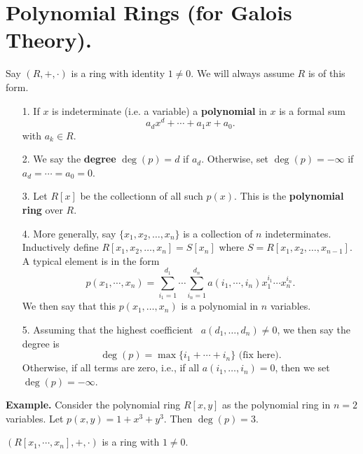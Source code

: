\documentclass[12pt,letterpaper]{algebra_book}
\theoremstyle{definition}
\begin{document}
\section{Polynomial Rings (for Galois Theory).}

\begin{definition}
    Say $(R, +, \cdot)$ is a ring with identity $1 \ne 0$. We will
    always assume $R$ is of this form. 
    \begin{itemize}
        \item[1.] If $x$  is indeterminate (i.e. a variable) a
        \textbf{polynomial} in $x$ is a formal sum 
        \[
            a_dx^d + \cdots + a_1x + a_0.
        \]
        with $a_k \in R$.
        \item[2.] We say the \textbf{degree} $\deg(p) = d$ if $a_d$.
        Otherwise, set  $\deg(p) = -\infty$ if $a_d = \cdots = a_0
        = 0$.
        \item[3.] Let $R[x]$ be the collectionn of all such
        $p(x)$. This is the \textbf{polynomial ring} over $R$.
        \item[4.] More generally, say $\{x_1, x_2, \dots, x_n\}$
        is a collection of $n$ indeterminates. Inductively define
        $R[x_1, x_2, \dots, x_n] = S[x_n]$ where $S = R[x_1, x_2,
        \dots, x_{n-1}]$. A typical element is in the form 
        \[
            p(x_1, \cdots, x_n) = \sum_{i_1 =  1}^{d_1}\cdots\sum_{i_n = 1}^{d_n}a(i_1, \cdots, i_n)x_1^{i_1}\cdots x_n^{i_n}.
        \] 
        We then say that this $p(x_1, \dots, x_n)$ is a polynomial
        in $n$ variables. 
        \item[5.] Assuming that the highest coefficient
        \    $a(d_1, \dots, d_n) \ne 0$, we then say the degree is
        \[
            \deg(p) = \max\{i_1  + \cdots + i_n\} \text{ (fix here)}.                
        \]
        Otherwise, if all terms are zero, i.e., if all $a(i_1,
        \dots, i_n) = 0$, then we set $\deg(p) = -\infty$.
    \end{itemize}
\end{definition}

\textbf{Example.}
Consider the polynomial ring $R[x, y]$ as the polynomial ring in
$n = 2$ variables. Let $p(x, y) = 1 + x^3 + y^3$. Then $\deg(p) =
3$. 

\begin{proposition}
    $(R[x_1, \cdots, x_n], + , \cdot)$ is a ring with $1 \ne 0$.
\end{proposition}
\end{document}
